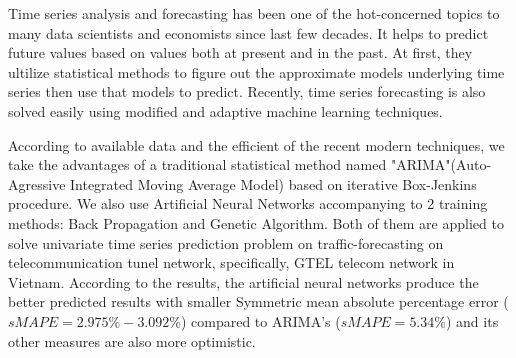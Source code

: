 


\begin{abstracts}       %

Time series analysis and forecasting has been one of the hot-concerned topics to many data scientists and economists since last few decades. It helps to predict future values based on values both at present and in the past. At first, they ultilize statistical methods to figure out the approximate models underlying time series then use that models to predict. Recently, time series forecasting is also solved easily using modified and adaptive machine learning techniques.

According to available data and the efficient of the recent modern techniques, we take the advantages of a traditional statistical method named "ARIMA"(Auto-Agressive Integrated Moving Average Model) based on iterative Box-Jenkins procedure. We also use Artificial Neural Networks accompanying to 2 training methods: Back Propagation  and Genetic Algorithm. Both of them are applied to solve univariate time series prediction problem on traffic-forecasting on telecommunication tunel network, specifically, GTEL telecom network in Vietnam. According to the results, the artificial neural networks produce the better predicted results with smaller Symmetric mean absolute percentage error ($sMAPE = 2.975\%-3.092\%$) compared to ARIMA's ($sMAPE=5.34\%$) and its other measures are also more optimistic.
\end{abstracts}

